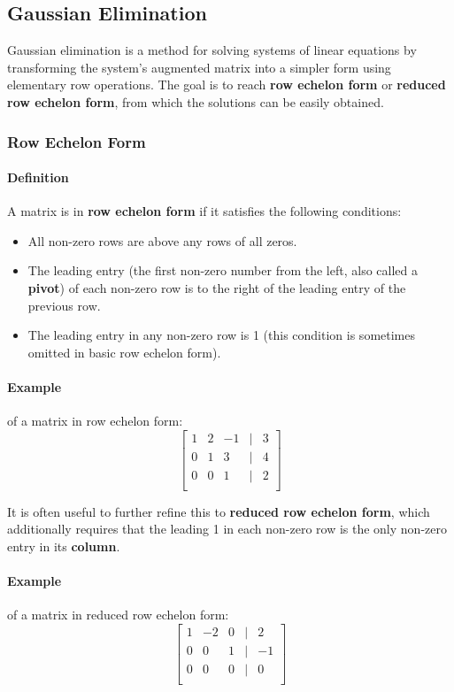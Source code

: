 \subsection{Gaussian Elimination}
Gaussian elimination is a method for solving systems of linear equations by transforming the system's augmented matrix into a simpler form using elementary row operations.
The goal is to reach \textbf{row echelon form} or \textbf{reduced row echelon form}, from which the solutions can be easily obtained.

\subsubsection*{Row Echelon Form} 
\paragraph*{Definition} A matrix is in \textbf{row echelon form} if it satisfies the following conditions:
\begin{itemize}
    \item All non-zero rows are above any rows of all zeros.
    \item The leading entry (the first non-zero number from the left, also called a \textbf{pivot}) of each non-zero row is to the right of the leading entry of the previous row.
    \item The leading entry in any non-zero row is 1 (this condition is sometimes omitted in basic row echelon form).
\end{itemize}

\paragraph*{Example} of a matrix in row echelon form:
\[\begin{bmatrix}
1 & 2 & -1 & | & 3 \\
0 & 1 & 3 & | & 4 \\
0 & 0 & 1 & | & 2 \\
\end{bmatrix}\]

It is often useful to further refine this to \textbf{reduced row echelon form}, which additionally requires that
the leading 1 in each non-zero row is the only non-zero entry in its \textbf{column}.

\paragraph*{Example} of a matrix in reduced row echelon form:
\[\begin{bmatrix}
1 & -2 & 0 & | & 2 \\
0 & 0 & 1 & | & -1 \\
0 & 0 & 0 & | & 0 \\
\end{bmatrix}\]

